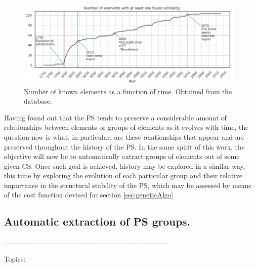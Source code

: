 \documentclass[article]{article}
\begin{document}
\begin{figure}[h!]
  \centering
	\includegraphics[width=18.0cm]{numberElems.png}
	\caption{Number of known elements as a function of time. Obtained from the database.}
	\label{fig:numElems_evol}
\end{figure}


Having found out that the PS tends to preserve a considerable amount of relationships between elements or groups of elements as it evolves with time, the question now is what, in particular, are these relationships that appear and are preserved throughout the history of the PS. In the same spirit of this work, the objective will now be to automatically extract groups of elements out of some given CS. Once such goal is achieved, history may be explored in a similar way, this time by exploring the evolution of each particular group and their relative importance in the structural stability of the PS, which may be assessed by means of the cost function devised for section \ref{sec:geneticAlgo}

\subsection{Automatic extraction of PS groups.}





\textbf{---------------------------------------------------------------}


Topics:
\end{document}
